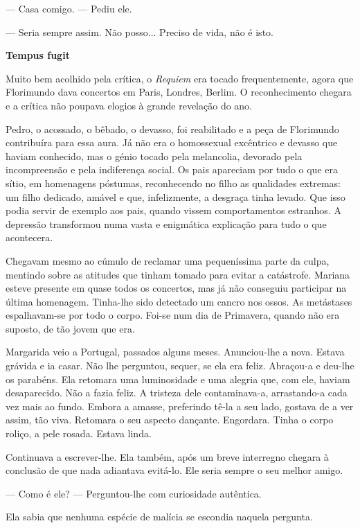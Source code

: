 --- Casa comigo. --- Pediu ele.

--- Seria sempre assim. Não posso... Preciso de vida, não é isto.

\vspace*{1.8cm}
\noindent{}\textbf{Tempus fugit}

Muito bem acolhido pela crítica, o \emph{Requiem }era tocado
frequentemente, agora que Florimundo dava concertos em Paris, Londres,
Berlim. O reconhecimento chegara e a crítica não poupava elogios à
grande revelação do ano.

Pedro, o acossado, o bêbado, o devasso, foi reabilitado e a peça de
Florimundo contribuíra para essa aura. Já não era o homossexual
excêntrico e devasso que haviam conhecido, mas o génio tocado pela
melancolia, devorado pela incompreensão e pela indiferença social. Os
pais apareciam por tudo o que era sítio, em homenagens póstumas,
reconhecendo no filho as qualidades extremas: um filho dedicado, amável
e que, infelizmente, a desgraça tinha levado. Que isso podia servir de
exemplo aos pais, quando vissem comportamentos estranhos. A depressão
transformou numa vasta e enigmática explicação para tudo o que
acontecera.

Chegavam mesmo ao cúmulo de reclamar uma pequeníssima parte da culpa,
mentindo sobre as atitudes que tinham tomado para evitar a catástrofe.
Mariana esteve presente em quase todos os concertos, mas já não
conseguiu participar na última homenagem. Tinha-lhe sido detectado um
cancro nos ossos. As metástases espalhavam-se por todo o corpo. Foi-se
num dia de Primavera, quando não era suposto, de tão jovem que era.

Margarida veio a Portugal, passados alguns meses. Anunciou-lhe a nova.
Estava grávida e ia casar. Não lhe perguntou, sequer, se ela era feliz.
Abraçou-a e deu-lhe os parabéns. Ela retomara uma luminosidade e uma
alegria que, com ele, haviam desaparecido. Não a fazia feliz. A tristeza
dele contaminava-a, arrastando-a cada vez mais ao fundo. Embora a
amasse, preferindo tê-la a seu lado, gostava de a ver assim, tão viva.
Retomara o seu aspecto dançante. Engordara. Tinha o corpo roliço, a pele
rosada. Estava linda.

Continuava a escrever-lhe. Ela também, após um breve interregno chegara
à conclusão de que nada adiantava evitá-lo. Ele seria sempre o seu
melhor amigo.

--- Como é ele? --- Perguntou-lhe com curiosidade autêntica.

Ela sabia que nenhuma espécie de malícia se escondia naquela pergunta.


